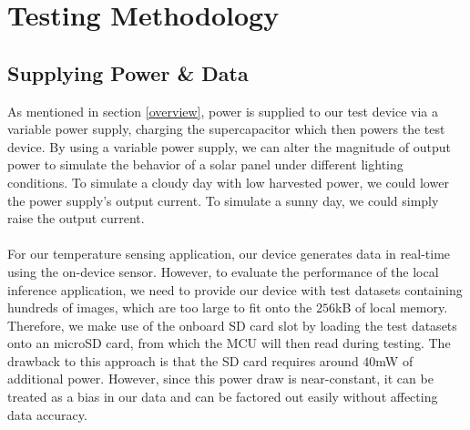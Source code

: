 \documentclass[twoside]{report}
\begin{document}
\section{Testing Methodology} \label{sec:testMethod}
\subsection{Supplying Power \& Data}
As mentioned in section \ref{overview}, power is supplied to our test device via a variable power supply, 
charging the supercapacitor which then powers the test device. By using a variable power supply, 
we can alter the magnitude of output power to simulate the behavior of a solar panel under 
different lighting conditions. To simulate a cloudy day with low harvested power, we could lower the power 
supply's output current. To simulate a sunny day, we could simply raise the output current.\\\\
For our temperature sensing application, our device generates data in real-time using the on-device sensor. 
However, to evaluate the performance of the local inference application, 
we need to provide our device with test datasets containing hundreds of images, which are too large to fit onto the $256$kB of 
local memory. Therefore, we make use of the onboard SD card slot by loading the test datasets onto 
an microSD card, from which the MCU will then read during testing. The drawback to this approach 
is that the SD card requires around $40$mW of additional power. However, since this power draw is 
near-constant, it can be treated as a bias in our data and can be factored out easily without 
affecting data accuracy.
\end{document}
